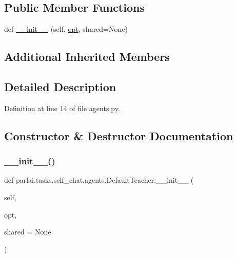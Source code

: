 \subsection*{Public Member Functions}
\begin{DoxyCompactItemize}
\item 
def \hyperlink{classparlai_1_1tasks_1_1self__chat_1_1agents_1_1DefaultTeacher_a29cf7f383ed619d7c2145ab22a740008}{\+\_\+\+\_\+init\+\_\+\+\_\+} (self, \hyperlink{classparlai_1_1core_1_1agents_1_1Teacher_a3ce6243860ce978a897922863ed32fa4}{opt}, shared=None)
\end{DoxyCompactItemize}
\subsection*{Additional Inherited Members}


\subsection{Detailed Description}


Definition at line 14 of file agents.\+py.



\subsection{Constructor \& Destructor Documentation}
\mbox{\label{classparlai_1_1tasks_1_1self__chat_1_1agents_1_1DefaultTeacher_a29cf7f383ed619d7c2145ab22a740008}} 
\subsubsection{\texorpdfstring{\+\_\+\+\_\+init\+\_\+\+\_\+()}{\_\_init\_\_()}}
{\footnotesize\ttfamily def parlai.\+tasks.\+self\+\_\+chat.\+agents.\+Default\+Teacher.\+\_\+\+\_\+init\+\_\+\+\_\+ (\begin{DoxyParamCaption}\item[{}]{self,  }\item[{}]{opt,  }\item[{}]{shared = {\ttfamily None} }\end{DoxyParamCaption})}



